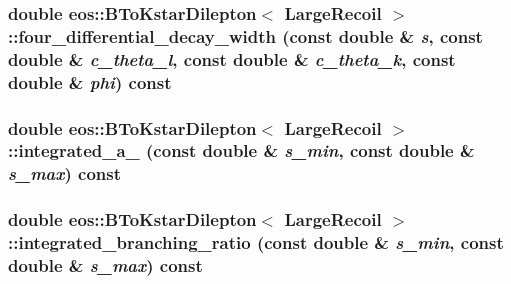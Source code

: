 \label{classeos_1_1BToKstarDilepton_3_01LargeRecoil_01_4_af6af253a6e5b782e3d3f96d2cbc4baaf}
\hypertarget{classeos_1_1BToKstarDilepton_3_01LargeRecoil_01_4_add07c0155502f992a11d641b3389e777}{
\subsubsection[{four\_\-differential\_\-decay\_\-width}]{\setlength{\rightskip}{0pt plus 5cm}double eos::BToKstarDilepton$<$ {\bf LargeRecoil} $>$::four\_\-differential\_\-decay\_\-width (const double \& {\em s}, \/  const double \& {\em c\_\-theta\_\-l}, \/  const double \& {\em c\_\-theta\_\-k}, \/  const double \& {\em phi}) const}}
\label{classeos_1_1BToKstarDilepton_3_01LargeRecoil_01_4_add07c0155502f992a11d641b3389e777}
\hypertarget{classeos_1_1BToKstarDilepton_3_01LargeRecoil_01_4_a303b3535c292601d41a60b3a466c4092}{
\subsubsection[{integrated\_\-a\_\-9}]{\setlength{\rightskip}{0pt plus 5cm}double eos::BToKstarDilepton$<$ {\bf LargeRecoil} $>$::integrated\_\-a\_ (const double \& {\em s\_\-min}, \/  const double \& {\em s\_\-max}) const}}
\label{classeos_1_1BToKstarDilepton_3_01LargeRecoil_01_4_a303b3535c292601d41a60b3a466c4092}
\hypertarget{classeos_1_1BToKstarDilepton_3_01LargeRecoil_01_4_a7a272263b3e040fabd6a78bb54557dbf}{
\subsubsection[{integrated\_\-branching\_\-ratio}]{\setlength{\rightskip}{0pt plus 5cm}double eos::BToKstarDilepton$<$ {\bf LargeRecoil} $>$::integrated\_\-branching\_\-ratio (const double \& {\em s\_\-min}, \/  const double \& {\em s\_\-max}) const}}
